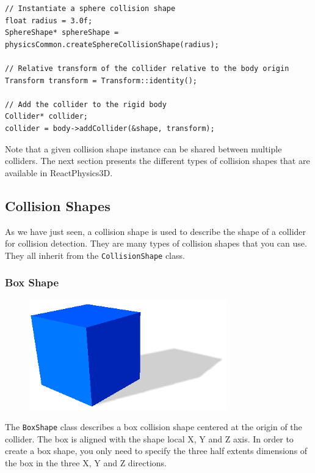 \documentclass[a4paper,12pt]{article}
\begin{document}
    \begin{lstlisting}
// Instantiate a sphere collision shape
float radius = 3.0f;
SphereShape* sphereShape = physicsCommon.createSphereCollisionShape(radius);

// Relative transform of the collider relative to the body origin
Transform transform = Transform::identity();

// Add the collider to the rigid body
Collider* collider;
collider = body->addCollider(&shape, transform);

  \end{lstlisting}

    \vspace{0.6cm}

    Note that a given collision shape instance can be shared between multiple colliders. The next section presents the different types of collision
    shapes that are available in ReactPhysics3D.

    \subsection{Collision Shapes}
    \label{sec:collisionshapes}

    As we have just seen, a collision shape is used to describe the shape of a collider for collision detection. They are many types of
    collision shapes that you can use. They all inherit from the \texttt{CollisionShape} class.

    \subsubsection{Box Shape}

    \begin{figure}[h]
        \centering
        \includegraphics{boxshape.png}
        \label{fig:boxshape}
    \end{figure}

    The \texttt{BoxShape} class describes a box collision shape centered at the origin of the collider. The box is aligned with the shape
    local X, Y and Z axis.  In order to create a box shape, you only need to specify the three half extents dimensions of the box in the three X, Y and
    Z directions. \\
\end{document}

